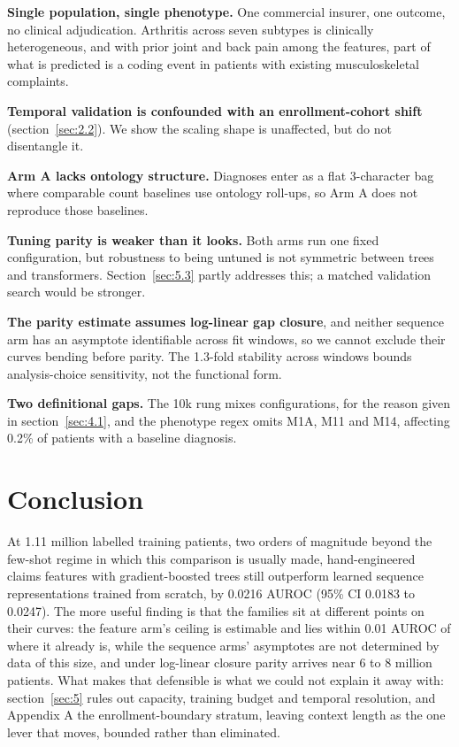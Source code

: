 \documentclass[10pt,twocolumn,letterpaper]{article}
\begin{document}
\textbf{Single population, single phenotype.} One commercial insurer, one outcome, no clinical adjudication. Arthritis across seven subtypes is clinically heterogeneous, and with prior joint and back pain among the features, part of what is predicted is a coding event in patients with existing musculoskeletal complaints.



\textbf{Temporal validation is confounded with an enrollment-cohort shift} (section~\ref{sec:2.2}). We show the scaling shape is unaffected, but do not disentangle it.



\textbf{Arm A lacks ontology structure.} Diagnoses enter as a flat 3-character bag where comparable count baselines use ontology roll-ups, so Arm A does not reproduce those baselines.



\textbf{Tuning parity is weaker than it looks.} Both arms run one fixed configuration, but robustness to being untuned is not symmetric between trees and transformers. Section~\ref{sec:5.3} partly addresses this; a matched validation search would be stronger.



\textbf{The parity estimate assumes log-linear gap closure}, and neither sequence arm has an asymptote identifiable across fit windows, so we cannot exclude their curves bending before parity. The 1.3-fold stability across windows bounds analysis-choice sensitivity, not the functional form.



\textbf{Two definitional gaps.} The 10k rung mixes configurations, for the reason given in section~\ref{sec:4.1}, and the phenotype regex omits M1A, M11 and M14, affecting 0.2\% of patients with a baseline diagnosis.







\section{Conclusion}\label{sec:8}



At 1.11 million labelled training patients, two orders of magnitude beyond the few-shot regime in which this comparison is usually made, hand-engineered claims features with gradient-boosted trees still outperform learned sequence representations trained from scratch, by 0.0216 AUROC (95\% CI 0.0183 to 0.0247). The more useful finding is that the families sit at different points on their curves: the feature arm's ceiling is estimable and lies within 0.01 AUROC of where it already is, while the sequence arms' asymptotes are not determined by data of this size, and under log-linear closure parity arrives near 6 to 8 million patients. What makes that defensible is what we could not explain it away with: section~\ref{sec:5} rules out capacity, training budget and temporal resolution, and Appendix A the enrollment-boundary stratum, leaving context length as the one lever that moves, bounded rather than eliminated.
\end{document}
